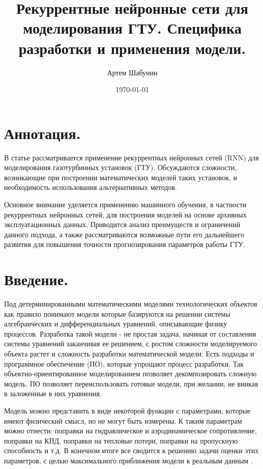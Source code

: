 \documentclass[12pt,a4paper]{article}
\title{Рекуррентные нейронные сети для моделирования ГТУ. Специфика разработки и применения модели.}
\author{Артем Шабунин}
\date{\today}
\begin{document}
	
\maketitle

\section*{Аннотация.}

В статье рассматривается применение рекуррентных нейронных сетей (RNN) для моделирования газотурбинных установок (ГТУ). Обсуждаются сложности, возникающие при построении математических моделей таких установок, и необходимость использования альтернативных методов.

Основное внимание уделяется применению машинного обучения, в частности рекуррентных нейронных сетей, для построения моделей на основе архивных эксплуатационных данных. Приводится анализ преимуществ и ограничений данного подхода, а также рассматриваются возможные пути его дальнейшего развития для повышения точности прогнозирования параметров работы ГТУ.

\section{Введение.}

Под детерминированными математическими моделями технологических объектов как правило понимают модели которые базируются на решении системы алгебраических и дифференциальных уравнений, описывающие физику процессов. Разработка такой модели - не простая задача, начиная от составления системы уравнений заканчивая ее решением, с ростом сложности моделируемого объекта растет и сложность разработки математической модели. Есть подходы и программное обеспечение (ПО), которые упрощают процесс разработки. Так объектно-ориентированное моделированием позволяет декомпозировать сложную модель. ПО позволяет переиспользовать готовые модели, при желании, не вникая в заложенные в них уравнения. 

Модель можно представить в виде некоторой функции с параметрами, которые имеют физический смысл, но не могут быть измерены. К таким параметрам можно отнести: поправки на гидравлическое и аэродинамическое сопротивление, поправки на КПД, поправки на тепловые потери, поправки на пропускную способность и т.д. В конечном итоге все сводится к решению задачи оценки этих параметров, с целью максимального приближения модели к реальным данным \cite{Bezruchko}.

\end{document}
